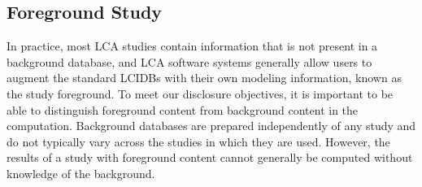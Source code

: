 \subsection{Foreground Study}

In practice, most LCA studies contain information that is not present in a background database, and LCA software systems generally allow users to augment the standard LCIDBs with their own modeling information, known as the study foreground.  To meet our disclosure objectives, it is important to be able to distinguish foreground content from background content in the computation.  Background databases are prepared independently of any study and do not typically vary across the studies in which they are used.  However, the results of a study with foreground content cannot generally be computed without knowledge of the background.  %

